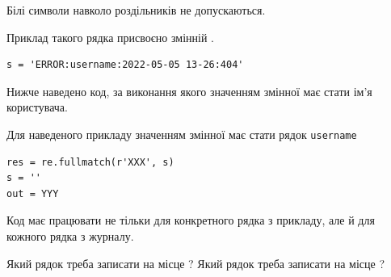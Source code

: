 \documentclass[12pt, ukrainian]{article}
\def\code#1{\Verb!#1!}
\begin{document}
{Білі символи навколо роздільників не допускаються.

Приклад такого рядка присвоєно змінній .



\begin{verbatim}
s = 'ERROR:username:2022-05-05 13-26:404'
\end{verbatim}


Нижче наведено код, за виконання якого значенням змінної  має стати ім'я користувача.

Для наведеного прикладу значенням змінної  має стати рядок \code{username}



\begin{verbatim}
res = re.fullmatch(r'XXX', s)
s = ''
out = YYY
\end{verbatim}


Код має працювати не тільки для конкретного рядка з прикладу, але й для кожного рядка з журналу.


Який рядок треба записати на місце  ?
Який рядок треба записати на місце  ?\par

}
\newpage
\end{document}
